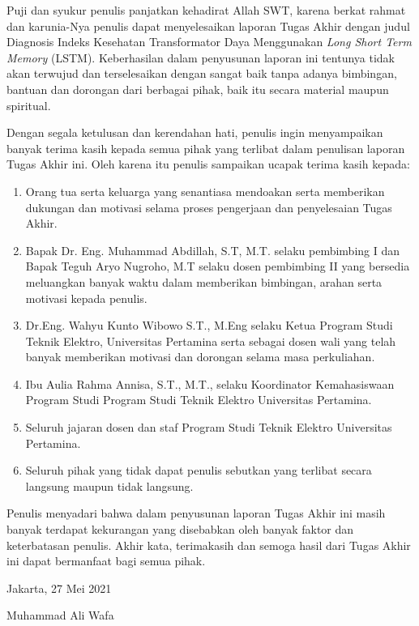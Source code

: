 Puji dan syukur penulis panjatkan kehadirat Allah SWT, karena berkat rahmat dan karunia-Nya penulis dapat menyelesaikan laporan Tugas Akhir dengan judul Diagnosis Indeks Kesehatan Transformator Daya Menggunakan  \textit{Long Short Term Memory} (LSTM). Keberhasilan dalam penyusunan laporan ini tentunya tidak akan terwujud dan terselesaikan dengan sangat baik tanpa adanya bimbingan, bantuan dan dorongan dari berbagai pihak, baik itu secara material maupun spiritual. \par
Dengan segala ketulusan dan kerendahan hati, penulis ingin menyampaikan banyak terima kasih kepada semua pihak yang terlibat dalam penulisan laporan Tugas Akhir ini. Oleh karena itu penulis sampaikan ucapak terima kasih kepada:

\begin{enumerate}
	\item Orang tua serta keluarga yang senantiasa mendoakan serta memberikan dukungan dan motivasi selama proses pengerjaan dan penyelesaian Tugas Akhir.
	\item Bapak Dr. Eng. Muhammad Abdillah, S.T, M.T. selaku pembimbing I dan Bapak Teguh Aryo
	Nugroho, M.T selaku dosen pembimbing II yang bersedia meluangkan banyak waktu dalam memberikan bimbingan, arahan serta motivasi kepada penulis.
	\item  Dr.Eng. Wahyu Kunto Wibowo S.T., M.Eng selaku Ketua Program Studi Teknik Elektro, Universitas Pertamina serta sebagai dosen wali yang telah banyak memberikan motivasi dan dorongan selama masa perkuliahan.
	\item Ibu Aulia Rahma Annisa, S.T., M.T., selaku Koordinator Kemahasiswaan Program Studi Program Studi Teknik Elektro Universitas Pertamina.
	\item Seluruh jajaran dosen dan staf Program Studi Teknik Elektro Universitas
	Pertamina.
	\item Seluruh pihak yang tidak dapat penulis sebutkan yang terlibat secara langsung maupun tidak langsung.
\end{enumerate}
Penulis menyadari bahwa dalam penyusunan laporan Tugas Akhir ini masih banyak terdapat kekurangan yang disebabkan oleh banyak faktor dan keterbatasan penulis. Akhir kata, terimakasih dan semoga hasil dari Tugas Akhir ini dapat bermanfaat bagi semua pihak.

	\vskip 1cm
	\hspace{10cm} Jakarta, 27 Mei 2021 \par
	\vskip 3cm
	\hspace{10cm} Muhammad Ali Wafa